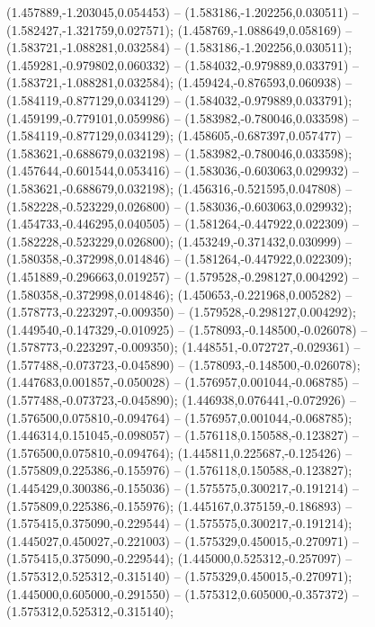 (1.457889,-1.203045,0.054453) -- (1.583186,-1.202256,0.030511) -- (1.582427,-1.321759,0.027571);
 (1.458769,-1.088649,0.058169) -- (1.583721,-1.088281,0.032584) -- (1.583186,-1.202256,0.030511);
 (1.459281,-0.979802,0.060332) -- (1.584032,-0.979889,0.033791) -- (1.583721,-1.088281,0.032584);
 (1.459424,-0.876593,0.060938) -- (1.584119,-0.877129,0.034129) -- (1.584032,-0.979889,0.033791);
 (1.459199,-0.779101,0.059986) -- (1.583982,-0.780046,0.033598) -- (1.584119,-0.877129,0.034129);
 (1.458605,-0.687397,0.057477) -- (1.583621,-0.688679,0.032198) -- (1.583982,-0.780046,0.033598);
 (1.457644,-0.601544,0.053416) -- (1.583036,-0.603063,0.029932) -- (1.583621,-0.688679,0.032198);
 (1.456316,-0.521595,0.047808) -- (1.582228,-0.523229,0.026800) -- (1.583036,-0.603063,0.029932);
 (1.454733,-0.446295,0.040505) -- (1.581264,-0.447922,0.022309) -- (1.582228,-0.523229,0.026800);
 (1.453249,-0.371432,0.030999) -- (1.580358,-0.372998,0.014846) -- (1.581264,-0.447922,0.022309);
 (1.451889,-0.296663,0.019257) -- (1.579528,-0.298127,0.004292) -- (1.580358,-0.372998,0.014846);
 (1.450653,-0.221968,0.005282) -- (1.578773,-0.223297,-0.009350) -- (1.579528,-0.298127,0.004292);
 (1.449540,-0.147329,-0.010925) -- (1.578093,-0.148500,-0.026078) -- (1.578773,-0.223297,-0.009350);
 (1.448551,-0.072727,-0.029361) -- (1.577488,-0.073723,-0.045890) -- (1.578093,-0.148500,-0.026078);
 (1.447683,0.001857,-0.050028) -- (1.576957,0.001044,-0.068785) -- (1.577488,-0.073723,-0.045890);
 (1.446938,0.076441,-0.072926) -- (1.576500,0.075810,-0.094764) -- (1.576957,0.001044,-0.068785);
 (1.446314,0.151045,-0.098057) -- (1.576118,0.150588,-0.123827) -- (1.576500,0.075810,-0.094764);
 (1.445811,0.225687,-0.125426) -- (1.575809,0.225386,-0.155976) -- (1.576118,0.150588,-0.123827);
 (1.445429,0.300386,-0.155036) -- (1.575575,0.300217,-0.191214) -- (1.575809,0.225386,-0.155976);
 (1.445167,0.375159,-0.186893) -- (1.575415,0.375090,-0.229544) -- (1.575575,0.300217,-0.191214);
 (1.445027,0.450027,-0.221003) -- (1.575329,0.450015,-0.270971) -- (1.575415,0.375090,-0.229544);
 (1.445000,0.525312,-0.257097) -- (1.575312,0.525312,-0.315140) -- (1.575329,0.450015,-0.270971);
 (1.445000,0.605000,-0.291550) -- (1.575312,0.605000,-0.357372) -- (1.575312,0.525312,-0.315140);
